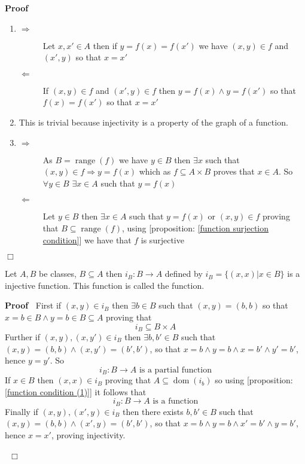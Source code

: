 \documentclass{book}
\newcommand{\tmop}[1]{\ensuremath{\operatorname{#1}}}
\newcommand{\tmtextbf}[1]{\text{{\bfseries{#1}}}}
\newenvironment{proof}{\noindent\textbf{Proof\ }}{\hspace*{\fill}$\Box$\medskip}
\begin{document}
\begin{proof}
  \quad
  \begin{enumerate}
    \item 
    \begin{description}
      \item[$\Rightarrow$] Let $x, x' \in A$ then if $y = f (x) = f (x')$ we
      have $(x, y) \in f$ and $(x', y)$ so that $x = x'$
      
      \item[$\Leftarrow$] If $(x, y) \in f$ and $(x', y) \in f$ then $y = f
      (x) \wedge y = f (x')$ so that $f (x) = f (x')$ so that $x = x'$
    \end{description}
    \item This is trivial because injectivity is a property of the graph of a
    function.
    
    \item 
    \begin{description}
      \item[$\Rightarrow$] As $B = \tmop{range} (f)$ we have $y \in B$ then
      $\exists x$ such that $(x, y) \in f \Rightarrow y = f (x)$ which as $f
      \subseteq A \times B$ proves that $x \in A$. So $\forall y \in B$
      $\exists x \in A$ such that $y = f (x)$
      
      \item[$\Leftarrow$] Let $y \in B$ then $\exists x \in A$ such that $y =
      f (x)$ or $(x, y) \in f$ proving that $B \subseteq \tmop{range} (f)$,
      using [proposition: \ref{function surjection condition}] we have that
      $f$ is surjective
    \end{description}
  \end{enumerate}
\end{proof}

\begin{example}
  \label{function inclusion function}{}Let $A, B$ be classes, $B
  \subseteq A$ then $i_B : B \rightarrow A$ defined by $i_B = \{ (x, x) |x \in
  B \}$ is a injective function. This function is called the
  \tmtextbf{inclusion} function. 
\end{example}

\begin{proof}
  First if $(x, y) \in i_B$ then $\exists b \in B$ such that $(x, y) = (b, b)$
  so that $x = b \in B \wedge y = b \in B \subseteq A$ proving that
  \[ i_B \subseteq B \times A \]
  Further if $(x, y), (x, y') \in i_B$ then $\exists b, b' \in B$ such that
  $(x, y) = (b, b) \wedge (x, y') = (b', b')$, so that $x = b \wedge y = b
  \wedge x = b' \wedge y' = b'$, hence $y = y'$. So
  \[ i_B : B \rightarrow A \text{ is a partial function} \]
  If $x \in B$ then $(x, x) \in i_B$ proving that $A \subseteq \tmop{dom}
  (i_b)$ so using [proposition: \ref{function condition (1)}] it follows that
  \[ i_B : B \rightarrow A \text{ is a function} \]
  Finally if $(x, y), (x', y) \in i_B$ then there exists $b, b' \in B$ such
  that $(x, y) = (b, b) \wedge (x', y) = (b', b')$, so that $x = b \wedge y =
  b \wedge x' = b' \wedge y = b'$, hence $x = x'$, proving injectivity.
  
  \ 
\end{proof}
\end{document}
